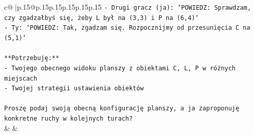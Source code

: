 \documentclass{article}
\begin{document}
{\begin{supertabular}{c@{$\;$}|p{.15\linewidth}@{}p{.15\linewidth}p{.15\linewidth}p{.15\linewidth}p{.15\linewidth}p{.15\linewidth}}
{{{\texttt{{-} Drugi gracz (ja): `POWIEDZ: Sprawdzam, czy zgadzałbyś się, żeby L był na (3,3) i P na (6,4)` } \\
\texttt{{-} Ty: `POWIEDZ: Tak, zgadzam się. Rozpocznijmy od przesunięcia C na (5,1)`} \\
\\ 
\texttt{**Potrzebuję:**} \\
\texttt{{-} Twojego obecnego widoku planszy z obiektami C, L, P w różnych miejscach} \\
\texttt{{-} Twojej strategii ustawienia obiektów} \\
\\ 
\texttt{Proszę podaj swoją obecną konfigurację planszy, a ja zaproponuję konkretne ruchy w kolejnych turach?} \\
            }
        }
    }
    & & \\ \\


\end{supertabular}}
\end{document}
